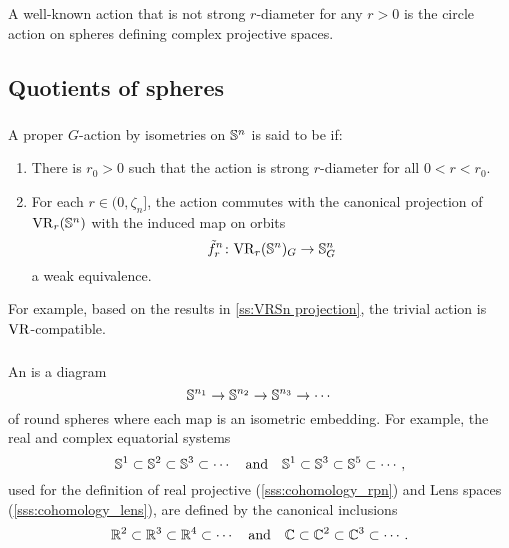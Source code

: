 A well-known action that is not strong \(r\)-diameter for any \(r>0\) is the circle action on spheres defining complex projective spaces.

\subsection{Quotients of spheres}

\subsubsection{}\label{ss:VR-compatible-Sn}

A proper \(G\)-action by isometries on \(\mathbb{S}^n\) is said to be  if:
\begin{enumerate}
	\item There is \(r_0 > 0\) such that the action is strong \(r\)-diameter for all \(0 < r < r_0\).
	\item For each \(r \in (0, \zeta_n]\), the action commutes with the canonical projection of \(\mathrm{VR}_r(\mathbb{S}^n)\) with the induced map on orbits
	\[
	\tilde f_r^n \colon \mathrm{VR}_r(\mathbb{S}^n)_G \to \mathbb{S}^n_G
	\]
	a weak equivalence.
\end{enumerate}

For example, based on the results in \cref{ss:VRSn projection}, the trivial action is \(\mathrm{VR}\)-compatible.

\subsubsection{}\label{subsub:VR-compatible-system}

An  is a diagram
\[
\mathbb{S}^{n_1} \to \mathbb{S}^{n_2} \to \mathbb{S}^{n_3} \to \dotsb
\]
of round spheres where each map is an isometric embedding.
For example, the real and complex equatorial systems
\[
\mathbb{S}^1 \subset \mathbb{S}^2 \subset \mathbb{S}^3 \subset \dotsb
\quad\text{and}\quad
\mathbb{S}^1 \subset \mathbb{S}^3 \subset \mathbb{S}^5 \subset \dotsb,
\]
used for the definition of real projective (\cref{sss:cohomology_rpn}) and Lens spaces (\cref{sss:cohomology_lens}), are defined by the canonical inclusions
\[
\mathbb{R}^2 \subset \mathbb{R}^3 \subset \mathbb{R}^4 \subset \dotsb
\quad\text{and}\quad
\mathbb{C} \subset \mathbb{C}^2 \subset \mathbb{C}^3 \subset \dotsb.
\]

\subsubsection{}\label{ss:system VR compatible}

